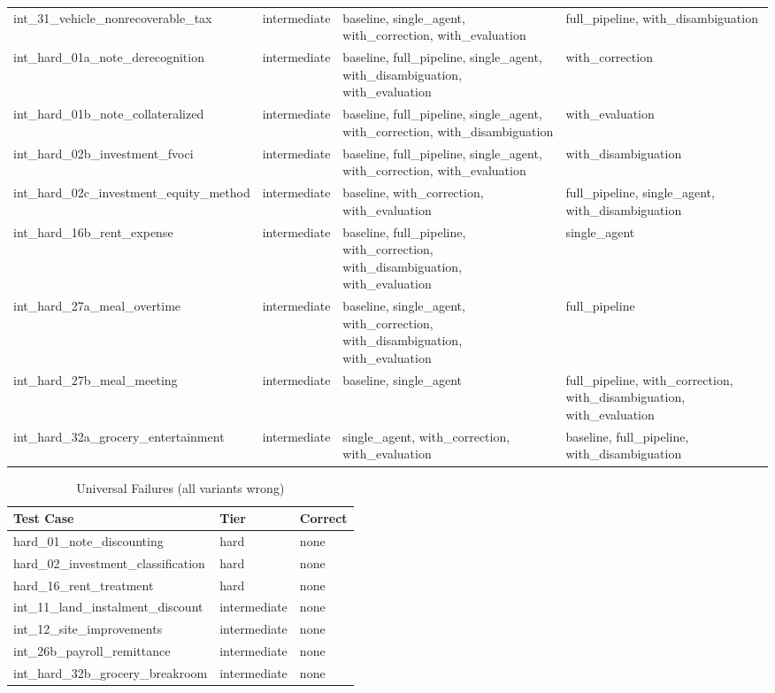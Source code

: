 \begin{table}[htbp]
{\begin{tabular}{l l l l}
  int\_31\_vehicle\_nonrecoverable\_tax & intermediate & baseline, single\_agent, with\_correction, with\_evaluation & full\_pipeline, with\_disambiguation \\
  int\_hard\_01a\_note\_derecognition & intermediate & baseline, full\_pipeline, single\_agent, with\_disambiguation, with\_evaluation & with\_correction \\
  int\_hard\_01b\_note\_collateralized & intermediate & baseline, full\_pipeline, single\_agent, with\_correction, with\_disambiguation & with\_evaluation \\
  int\_hard\_02b\_investment\_fvoci & intermediate & baseline, full\_pipeline, single\_agent, with\_correction, with\_evaluation & with\_disambiguation \\
  int\_hard\_02c\_investment\_equity\_method & intermediate & baseline, with\_correction, with\_evaluation & full\_pipeline, single\_agent, with\_disambiguation \\
  int\_hard\_16b\_rent\_expense & intermediate & baseline, full\_pipeline, with\_correction, with\_disambiguation, with\_evaluation & single\_agent \\
  int\_hard\_27a\_meal\_overtime & intermediate & baseline, single\_agent, with\_correction, with\_disambiguation, with\_evaluation & full\_pipeline \\
  int\_hard\_27b\_meal\_meeting & intermediate & baseline, single\_agent & full\_pipeline, with\_correction, with\_disambiguation, with\_evaluation \\
  int\_hard\_32a\_grocery\_entertainment & intermediate & single\_agent, with\_correction, with\_evaluation & baseline, full\_pipeline, with\_disambiguation \\
\bottomrule
\end{tabular}}\end{table}

\begin{table}[htbp]
\centering
\caption{Universal Failures (all variants wrong)}
\label{tab:all-fail}
\begin{tabular}{l l l}
\toprule
Test Case & Tier & Correct \\
\midrule
  hard\_01\_note\_discounting & hard & none \\
  hard\_02\_investment\_classification & hard & none \\
  hard\_16\_rent\_treatment & hard & none \\
  int\_11\_land\_instalment\_discount & intermediate & none \\
  int\_12\_site\_improvements & intermediate & none \\
  int\_26b\_payroll\_remittance & intermediate & none \\
  int\_hard\_32b\_grocery\_breakroom & intermediate & none \\
\bottomrule
\end{tabular}
\end{table}
